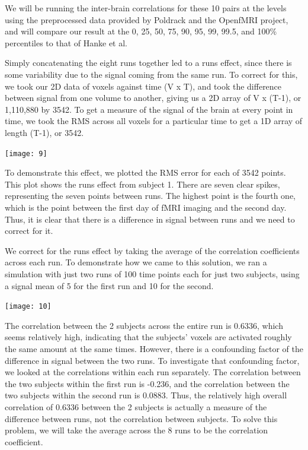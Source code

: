 We will be running the inter-brain correlations for these 10 pairs at the 
levels using the preprocessed data provided by Poldrack and the OpenfMRI project, 
and will compare our result at the 0, 25, 50, 75, 90, 95, 99, 99.5, and 100\%
percentiles to that of Hanke et al.

Simply concatenating the eight runs together led to a runs effect, since there
is some variability due to the signal coming from the same run. To correct for 
this, we took our 2D data of voxels against time (V x T), and took the difference 
between signal from one volume to another, giving us a 2D array of V x (T-1), or
1,110,880 by 3542. To get a measure of the signal of the brain at every point in
time, we took the RMS across all voxels for a particular time to get a 1D array 
of length (T-1), or 3542. 

\begin{center}                                                                  
\texttt{[image: 9]}                                                 
\end{center}   

To demonstrate this effect, we plotted the RMS error for each of 3542 points.  
This plot shows the runs effect from subject 1.  There are seven clear spikes, 
representing the seven points between runs.  The highest point is the fourth 
one, which is the point between the first day of fMRI imaging and the second
day.  Thus, it is clear that there is a difference in signal between runs and
we need to correct for it.  

We correct for the runs effect by taking the average of the correlation 
coefficients across each run.  To demonstrate how we came to this solution, 
we ran a simulation with just two runs of 100 time points each for just two 
subjects, using a signal mean of 5 for the first run and 10 for the second.  
\begin{center}                                                                  
\texttt{[image: 10]} 
\end{center}  
The correlation between the 2 subjects across the entire run is 0.6336, which
seems relatively high, indicating that the subjects' voxels are activated 
roughly the same amount at the same times.  However, there is a confounding
factor of the difference in signal between the two runs.  To investigate that
confounding factor, we looked at the correlations within each run separately.  
The correlation between the two subjects within the first run is -0.236, and 
the correlation between the two subjects within the second run is 0.0883.  
Thus, the relatively high overall correlation of 0.6336 between the 2 subjects 
is actually a measure of the difference between runs, not the correlation 
between subjects.  To solve this problem, we will take the average across the 8
runs to be the correlation coefficient.

